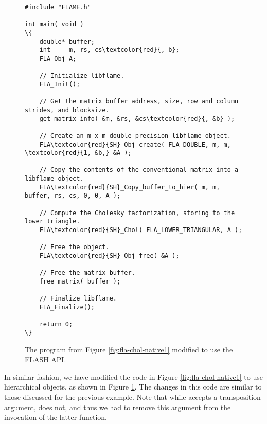 \begin{figure}[t]
\begin{Verbatim}[frame=single,framesep=2.5mm,xleftmargin=5mm,commandchars=\\\{\},fontsize=\footnotesize]
#include "FLAME.h"

int main( void )
\{
    double* buffer;
    int     m, rs, cs\textcolor{red}{, b};
    FLA_Obj A;

    // Initialize libflame.
    FLA_Init();

    // Get the matrix buffer address, size, row and column strides, and blocksize.
    get_matrix_info( &m, &rs, &cs\textcolor{red}{, &b} );

    // Create an m x m double-precision libflame object.
    FLA\textcolor{red}{SH}_Obj_create( FLA_DOUBLE, m, m, \textcolor{red}{1, &b,} &A );

    // Copy the contents of the conventional matrix into a libflame object.
    FLA\textcolor{red}{SH}_Copy_buffer_to_hier( m, m, buffer, rs, cs, 0, 0, A );

    // Compute the Cholesky factorization, storing to the lower triangle.
    FLA\textcolor{red}{SH}_Chol( FLA_LOWER_TRIANGULAR, A );

    // Free the object.
    FLA\textcolor{red}{SH}_Obj_free( &A );

    // Free the matrix buffer.
    free_matrix( buffer );

    // Finalize libflame.
    FLA_Finalize();

    return 0;
\}
\end{Verbatim}
\caption{
The program from Figure \ref{fig:fla-chol-native1} modified to use the
FLASH API.
}
\label{fig:flash-chol-native1}
\end{figure}

In similar fashion, we have modified the code in Figure \ref{fig:fla-chol-native1}
to use hierarchical objects, as shown in Figure \ref{fig:flash-chol-native1}.
The changes in this code are similar to those discussed for the previous example.
Note that while \flacopybuffertoobject accepts a transposition argument,
\flashcopyflattohier does not, and thus we had to remove this
argument from the invocation of the latter function.

